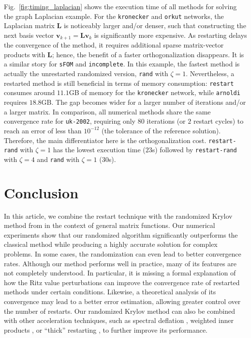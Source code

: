 \documentclass[smallextended]{svjour3}
\renewcommand{\vec}[1]{\mathbf{#1}}
\newcommand{\mat}[1]{\mathbf{#1}}
\begin{document}
Fig.~\ref{fig:timing_laplacian} shows the execution time of all methods for solving the graph Laplacian example. For the \texttt{kronecker} and \texttt{orkut} networks, the Laplacian matrix $\mat{L}$ is noticeably larger and/or denser, such that constructing the next basis vector $\vec{v}_{k + 1} = \mat{L} \vec{v}_k$ is significantly more expensive. As restarting delays the convergence of the method, it requires additional sparse matrix-vector products with $\mat{L}$; hence, the benefit of a faster orthogonalization disappears. It is a similar story for \texttt{sFOM} and \texttt{incomplete}. In this example, the fastest method is actually the unrestarted randomized version, \texttt{rand} with $\zeta = 1$. Nevertheless, a restarted method is still beneficial in terms of memory consumption: \texttt{restart} consumes around $11.1$GB of memory for the \texttt{kronecker} network, while \texttt{arnoldi} requires $18.8$GB. The gap becomes wider for a larger number of iterations and/or a larger matrix. In comparison, all numerical methods share the same convergence rate for \texttt{uk-2002}, requiring only $80$ iterations (or $2$ restart cycles) to reach an error of less than $10^{-12}$ (the tolerance of the reference solution). Therefore, the main differentiator here is the orthogonalization cost. \texttt{restart-rand} with $\zeta = 1$ has the lowest execution time ($23$s) followed by \texttt{restart-rand} with $\zeta = 4$ and \texttt{rand} with $\zeta = 1$ ($30$s).

\section{Conclusion}
\label{sec:conclusion}
In this article, we combine the restart technique with the randomized Krylov method from \cite{timsit_randomized_2023} in the context of general matrix functions. Our numerical experiments show that our randomized algorithm significantly outperforms the classical method while producing a highly accurate solution for complex problems. In some cases, the randomization can even lead to better convergence rates. Although our method performs well in practice, many of its features are not completely understood. In particular, it is missing a formal explanation of how the Ritz value perturbations can improve the convergence rate of restarted methods under certain conditions. Likewise, a theoretical analysis of its convergence may lead to a better error estimation, allowing greater control over the number of restarts. Our randomized Krylov method can also be combined with other acceleration techniques, such as spectral deflation \cite{eiermann_deflated_2011}, weighted inner products \cite{embree_weighted_2017}, or ``thick'' restarting \cite{baker_technique_2005}, to further improve its performance.
\end{document}
